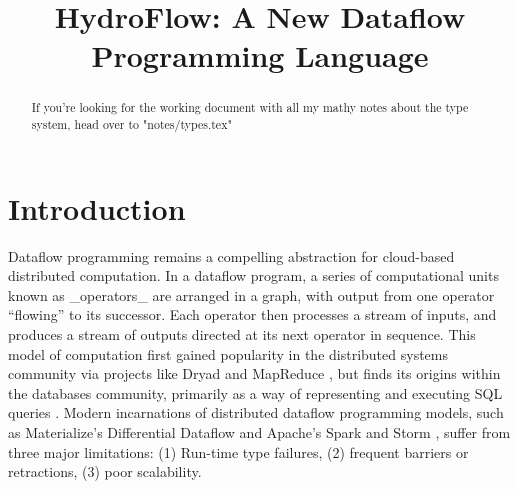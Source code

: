 

\let\Bbbk\relax
\usepackage{amssymb}
\usepackage[checkNoComments]{hydrocomments}
\usepackage{utf8math,ttquot,mathpartir,amsmath, mathtools,multicol,xspace,stmaryrd }




\title{HydroFlow: A New Dataflow Programming Language}




\begin{abstract}


If you're looking for the working document with all my mathy notes about the type system, head over to "notes/types.tex"

\end{abstract}

\maketitle

\section{Introduction}


Dataflow programming remains a compelling abstraction for cloud-based distributed computation.  In a dataflow program, a series of computational units known as _operators_ are arranged in a graph, with output from one operator ``flowing'' to its successor.  Each operator then processes a stream of inputs, and produces a stream of outputs directed at its next operator in sequence. This model of computation first gained popularity in the distributed systems community via projects like Dryad \cite{dryad} and MapReduce \cite{mapreduce}, but finds its origins within the databases community, primarily as a way of representing and executing SQL queries \cite{sql-dataflow}. Modern incarnations of distributed dataflow programming models, such as Materialize's Differential Dataflow and Apache's Spark and Storm \cite{spark, storm}, suffer from three major limitations: (1) Run-time type failures, (2) frequent barriers or retractions, (3) poor scalability. 

